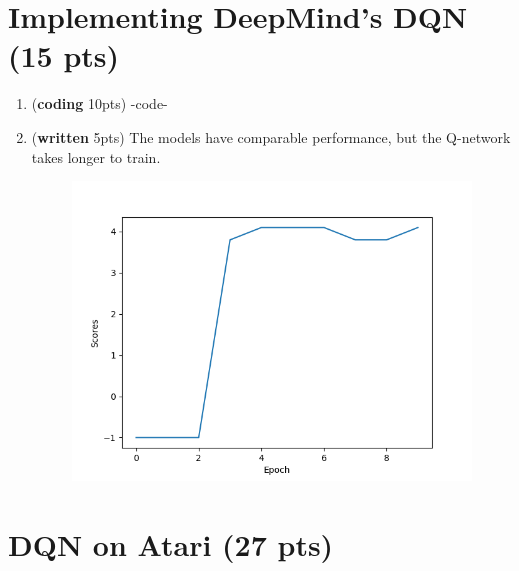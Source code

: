 \documentclass{article}
\begin{document}
\section{Implementing DeepMind's DQN (15 pts)}

\begin{enumerate}

\item (\textbf{coding} 10pts) -code-

\item (\textbf{written} 5pts) The models have comparable performance, but the Q-network takes longer to train.
\begin{figure}[H]
	\centering
	\includegraphics[width=.5\linewidth]{scores_qn}
\end{figure}

\end{enumerate}

\section{DQN on Atari (27 pts)}
\end{document}
